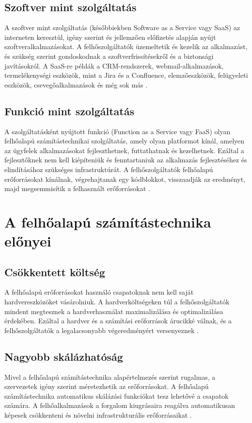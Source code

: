 \subsection{Szoftver mint szolgáltatás}
A szoftver mint szolgáltatás (későbbiekben Software as a Service vagy SaaS) az interneten keresztül, igény szerint és jellemzően előfizetés alapján nyújt szoftveralkalmazásokat.
A felhőszolgáltatók üzemeltetik és kezelik az alkalmazást, és szükség szerint gondoskodnak a szoftverfrissítésekről és a biztonsági javításokról.
A SaaS-re példák a CRM-rendszerek, webmail-alkalmazások, termelékenységi eszközök, mint a Jira és a Confluence, elemzőeszközök, felügyeleti eszközök, csevegőalkalmazások és még sok más \cite{cloudComp}.

\subsection{Funkció mint szolgáltatás}
A szolgáltatásként nyújtott funkció (Function as a Service vagy FaaS) olyan felhőalapú számítástechnikai szolgáltatás, amely olyan platformot kínál, amelyen az ügyfelek alkalmazásokat fejleszthetnek, futtathatnak és kezelhetnek.
Ezáltal a fejlesztőknek nem kell kiépíteniük és fenntartaniuk az alkalmazás fejlesztéséhez és elindításához szükséges infrastruktúrát.
A felhőszolgáltatók felhőalapú erőforrásokat kínálnak, végrehajtanak egy kódblokkot, visszaadják az eredményt, majd megsemmisítik a felhasznált erőforrásokat \cite{cloudComp}.

\section{A felhőalapú számítástechnika előnyei}
\subsection*{Csökkentett költség}
A felhőalapú erőforrásokat használó csapatoknak nem kell saját hardvereszközöket vásárolniuk.
A hardverköltségeken túl a felhőszolgáltatók mindent megtesznek a hardverhasználat maximalizálása és optimalizálása érdekében.
Ezáltal a hardver és a számítási erőforrások árucikké válnak, és a felhőszolgáltatók a legalacsonyabb végeredményért versenyeznek \cite{cloudComp}.

\subsection*{Nagyobb skálázhatóság}
Mivel a felhőalapú számítástechnika alapértelmezés szerint rugalmas, a szervezetek igény szerint méretezhetik az erőforrásokat.
A felhőalapú számítástechnika automatikus skálázási funkciókat tesz lehetővé a csapatok számára.
A felhőalkalmazások a forgalom kiugrásaira reagálva automatikusan képesek csökkenteni és növelni infrastrukturális erőforrásaikat \cite{cloudComp}.

